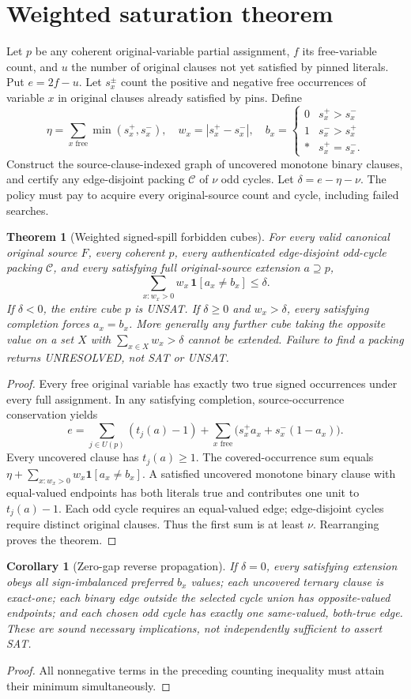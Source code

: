 \documentclass[11pt]{article}
\newtheorem{theorem}{Theorem}
\newtheorem{corollary}{Corollary}
\begin{document}
\section{Weighted saturation theorem}
Let $p$ be any coherent original-variable partial assignment, $f$ its free-variable count, and $u$ the number of original clauses not yet satisfied by pinned literals. Put $e=2f-u$. Let $s_x^\pm$ count the positive and negative free occurrences of variable $x$ in original clauses already satisfied by pins. Define
\[
\eta=\sum_{x\text{ free}}\min(s_x^+,s_x^-),\quad
w_x=|s_x^+-s_x^-|,\quad
b_x=\begin{cases}0&s_x^+>s_x^-\\1&s_x^->s_x^+\\ *&s_x^+=s_x^-.\end{cases}
\]
Construct the source-clause-indexed graph of uncovered monotone binary clauses, and certify any edge-disjoint packing $\mathcal C$ of $\nu$ odd cycles. Let $\delta=e-\eta-\nu$. The policy must pay to acquire every original-source count and cycle, including failed searches.
\begin{theorem}[Weighted signed-spill forbidden cubes]
For every valid canonical original source $F$, every coherent $p$, every authenticated edge-disjoint odd-cycle packing $\mathcal C$, and every satisfying full original-source extension $a\supseteq p$,
\[
\boxed{\sum_{x:w_x>0}w_x\,\mathbf1[a_x\ne b_x]\le\delta.}\tag{1}
\]
If $\delta<0$, the entire cube $p$ is UNSAT. If $\delta\ge0$ and $w_x>\delta$, every satisfying completion forces $a_x=b_x$. More generally any further cube taking the opposite value on a set $X$ with $\sum_{x\in X}w_x>\delta$ cannot be extended. Failure to find a packing returns UNRESOLVED, not SAT or UNSAT.
\end{theorem}
\begin{proof}
Every free original variable has exactly two true signed occurrences under every full assignment. In any satisfying completion, source-occurrence conservation yields
\[
e=\sum_{j\in U(p)}(t_j(a)-1)+
\sum_{x\text{ free}}\bigl(s_x^+a_x+s_x^-(1-a_x)\bigr).
\]
Every uncovered clause has $t_j(a)\ge1$. The covered-occurrence sum equals $\eta+\sum_{x:w_x>0}w_x\mathbf1[a_x\ne b_x]$. A satisfied uncovered monotone binary clause with equal-valued endpoints has both literals true and contributes one unit to $t_j(a)-1$. Each odd cycle requires an equal-valued edge; edge-disjoint cycles require distinct original clauses. Thus the first sum is at least $\nu$. Rearranging proves the theorem.
\end{proof}
\begin{corollary}[Zero-gap reverse propagation]
If $\delta=0$, every satisfying extension obeys all sign-imbalanced preferred $b_x$ values; each uncovered ternary clause is exact-one; each binary edge outside the selected cycle union has opposite-valued endpoints; and each chosen odd cycle has exactly one same-valued, both-true edge. These are sound necessary implications, not independently sufficient to assert SAT.
\end{corollary}
\begin{proof}All nonnegative terms in the preceding counting inequality must attain their minimum simultaneously.\end{proof}
\end{document}

